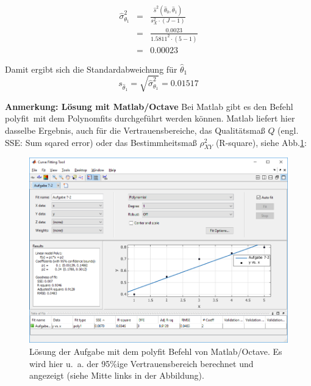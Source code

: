 \begin{eqnarray}
\hat\sigma^2_{\theta_1} &=& \frac{ \hat s^2(\hat{\theta}_0 ,\hat{\theta}_1 )}
{s^2_X \cdot (J- 1) }
\nonumber \\
&=& \frac{ 0.0023}
{1.5811^2 \cdot (5- 1) } \nonumber \\
&=& 0.00023
\end{eqnarray}

Damit ergibt sich die Standardabweichung für $\hat\theta_1$
\[
s_{\hat\theta_1} = \sqrt{\hat\sigma_{\theta_1}^2} = 0.01517
\]

\newpage
\textbf{Anmerkung: Lösung mit Matlab/Octave} 
Bei Matlab gibt es den Befehl \glqq polyfit\grqq ~mit dem Polynomfits durchgeführt werden können. Matlab liefert hier dasselbe Ergebnis, auch für die Vertrauensbereiche, das Qualitätsmaß $Q$ (engl. SSE: Sum sqared error) oder das Bestimmheitsmaß $\rho^2_{XY}$ (R-square), siehe Abb.\ref{fig:MatlabPolyfit}:
\begin{figure}[!htp]
	\begin{center}
		\includegraphics[width=160mm]{02_vorlesung/media/Matlab_CFTool.png}
		\caption{Lösung der Aufgabe mit dem polyfit Befehl von Matlab/Octave. 
		Es wird hier u.~a. der 95\%ige Vertrauensbereich berechnet und
		angezeigt (siehe Mitte links in der Abbildung).}
		\label{fig:MatlabPolyfit}
	\end{center}
\end{figure}

